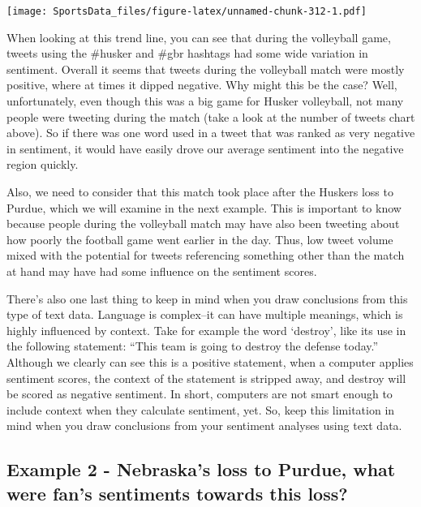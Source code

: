 \documentclass[]{book}
\begin{document}
\texttt{[image: SportsData\_files/figure-latex/unnamed-chunk-312-1.pdf]}

When looking at this trend line, you can see that during the volleyball game, tweets using the \#husker and \#gbr hashtags had some wide variation in sentiment. Overall it seems that tweets during the volleyball match were mostly positive, where at times it dipped negative. Why might this be the case? Well, unfortunately, even though this was a big game for Husker volleyball, not many people were tweeting during the match (take a look at the number of tweets chart above). So if there was one word used in a tweet that was ranked as very negative in sentiment, it would have easily drove our average sentiment into the negative region quickly.

Also, we need to consider that this match took place after the Huskers loss to Purdue, which we will examine in the next example. This is important to know because people during the volleyball match may have also been tweeting about how poorly the football game went earlier in the day. Thus, low tweet volume mixed with the potential for tweets referencing something other than the match at hand may have had some influence on the sentiment scores.

There's also one last thing to keep in mind when you draw conclusions from this type of text data. Language is complex--it can have multiple meanings, which is highly influenced by context. Take for example the word `destroy', like its use in the following statement: ``This team is going to destroy the defense today.'' Although we clearly can see this is a positive statement, when a computer applies sentiment scores, the context of the statement is stripped away, and destroy will be scored as negative sentiment. In short, computers are not smart enough to include context when they calculate sentiment, yet. So, keep this limitation in mind when you draw conclusions from your sentiment analyses using text data.

\hypertarget{example-2---nebraskas-loss-to-purdue-what-were-fans-sentiments-towards-this-loss}{%
\subsection{Example 2 - Nebraska's loss to Purdue, what were fan's sentiments towards this loss?}\label{example-2---nebraskas-loss-to-purdue-what-were-fans-sentiments-towards-this-loss}}
\end{document}
